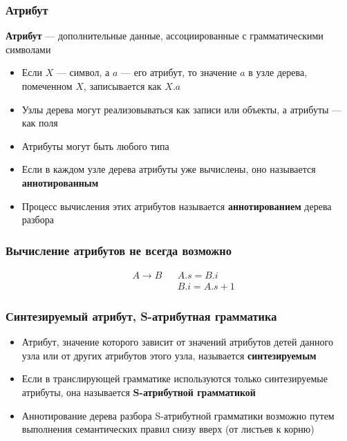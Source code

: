 \documentclass{beamer}
\begin{document}
\begin{frame}[fragile]
  \transwipe[direction=90]
  \frametitle{Атрибут}

\begin{center}
    \textbf{Атрибут} --- дополнительные данные, ассоциированные с грамматическими символами
\end{center}
  \begin{itemize}
    \item Если $X$ --- символ, а $a$ --- его атрибут, то значение $a$ в узле дерева, помеченном $X$, записывается как $X.a$
    \item Узлы дерева могут реализовываться как записи или объекты, а атрибуты --- как поля
    \item Атрибуты могут быть любого типа
    \item Если в каждом узле дерева атрибуты уже вычислены, оно называется \textbf{аннотированным}
    \item Процесс вычисления этих атрибутов называется \textbf{аннотированием} дерева разбора
  \end{itemize}
\end{frame}

\begin{frame}[fragile]
  \transwipe[direction=90]
  \frametitle{Вычисление атрибутов не всегда возможно}
$$
\begin{array}{clcl}
&A \rightarrow    B   & & A.s = B.i \\
&                     & & B.i = A.s + 1
\end{array}
$$
\end{frame}


\begin{frame}[fragile]
  \transwipe[direction=90]
  \frametitle{Синтезируемый атрибут, S-атрибутная грамматика}
  \begin{itemize}
    \item Атрибут, значение которого зависит от значений атрибутов детей данного узла или от других атрибутов этого узла, называется \textbf{синтезируемым}
    \item Если в транслирующей грамматике используются только синтезируемые атрибуты, она называется \textbf{S-атрибутной грамматикой}
    \item Аннотирование дерева разбора S-атрибутной грамматики возможно путем выполнения семантических правил снизу вверх (от листьев к корню)
  \end{itemize}

\end{frame}
\end{document}
